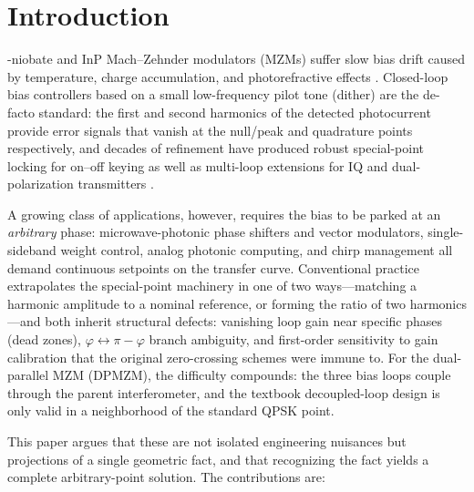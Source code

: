 \documentclass[journal]{IEEEtran}
\begin{document}
\IEEEpeerreviewmaketitle

\section{Introduction}
-niobate and InP Mach--Zehnder modulators (MZMs)
suffer slow bias drift caused by temperature, charge accumulation, and
photorefractive effects \cite{salvestrini2011,chen2011}. Closed-loop bias
controllers based on a small low-frequency pilot tone (dither) are the
de-facto standard: the first and second harmonics of the detected
photocurrent provide error signals that vanish at the null/peak and
quadrature points respectively, and decades of refinement have produced
robust special-point locking for on--off keying as well as multi-loop
extensions for IQ and dual-polarization transmitters
\cite{cho2006,sotoodeh2011,kawakami2012}.

A growing class of applications, however, requires the bias to be
parked at an \emph{arbitrary} phase: microwave-photonic phase shifters
and vector modulators, single-sideband weight control, analog photonic
computing, and chirp management all demand continuous setpoints on the
transfer curve. Conventional practice extrapolates the special-point
machinery in one of two ways---matching a harmonic amplitude to a
nominal reference, or forming the ratio of two harmonics---and both
inherit structural defects: vanishing loop gain near specific phases
(dead zones), $\varphi\leftrightarrow\pi-\varphi$ branch ambiguity, and
first-order sensitivity to gain calibration that the original
zero-crossing schemes were immune to. For the dual-parallel MZM (DPMZM),
the difficulty compounds: the three bias loops couple through the parent
interferometer, and the textbook decoupled-loop design is only valid in
a neighborhood of the standard QPSK point.

This paper argues that these are not isolated engineering nuisances but
projections of a single geometric fact, and that recognizing the fact
yields a complete arbitrary-point solution. The contributions are:
\end{document}
